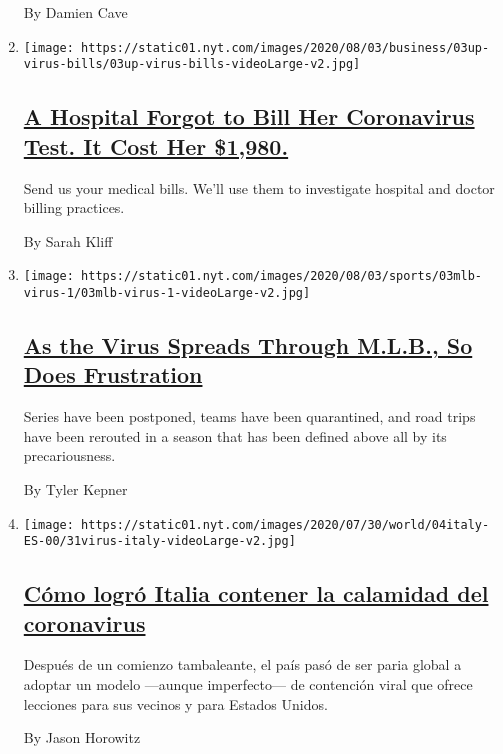 \begin{enumerate}
  By Damien Cave
\item
  \texttt{[image: https://static01.nyt.com/images/2020/08/03/business/03up-virus-bills/03up-virus-bills-videoLarge-v2.jpg]}

  \hypertarget{a-hospital-forgot-to-bill-her-coronavirus-test-it-cost-her-1980}{%
  \subsection{\texorpdfstring{\href{/2020/08/03/upshot/nj-coronavirus-medical-bill.html}{A
  Hospital Forgot to Bill Her Coronavirus Test. It Cost Her
  \$1,980.}}{A Hospital Forgot to Bill Her Coronavirus Test. It Cost Her \$1,980.}}\label{a-hospital-forgot-to-bill-her-coronavirus-test-it-cost-her-1980}}

  Send us your medical bills. We'll use them to investigate hospital and
  doctor billing practices.

  By Sarah Kliff
\item
  \texttt{[image: https://static01.nyt.com/images/2020/08/03/sports/03mlb-virus-1/03mlb-virus-1-videoLarge-v2.jpg]}

  \hypertarget{as-the-virus-spreads-through-mlb-so-does-frustration}{%
  \subsection{\texorpdfstring{\href{/2020/08/03/sports/baseball/mlb-coronavirus-outbreak.html}{As
  the Virus Spreads Through M.L.B., So Does
  Frustration}}{As the Virus Spreads Through M.L.B., So Does Frustration}}\label{as-the-virus-spreads-through-mlb-so-does-frustration}}

  Series have been postponed, teams have been quarantined, and road
  trips have been rerouted in a season that has been defined above all
  by its precariousness.

  By Tyler Kepner
\item
  \texttt{[image: https://static01.nyt.com/images/2020/07/30/world/04italy-ES-00/31virus-italy-videoLarge-v2.jpg]}

  \hypertarget{cuxf3mo-logruxf3-italia-contener-la-calamidad-del-coronavirus}{%
  \subsection{\texorpdfstring{\href{/es/2020/08/05/espanol/mundo/italia-reapertura-coronavirus.html}{Cómo
  logró Italia contener la calamidad del
  coronavirus}}{Cómo logró Italia contener la calamidad del coronavirus}}\label{cuxf3mo-logruxf3-italia-contener-la-calamidad-del-coronavirus}}

  Después de un comienzo tambaleante, el país pasó de ser paria global a
  adoptar un modelo ---aunque imperfecto--- de contención viral que
  ofrece lecciones para sus vecinos y para Estados Unidos.

  By Jason Horowitz
\end{enumerate}

